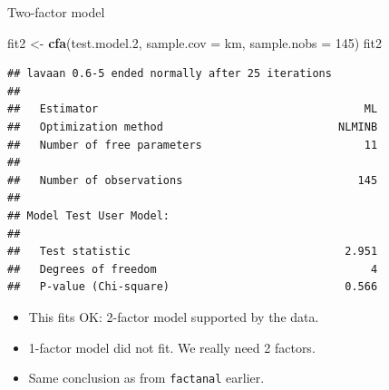 \documentclass[ignorenonframetext,]{beamer}
\newenvironment{Shaded}{\begin{snugshade}}{\end{snugshade}}
\newcommand{\DataTypeTok}[1]{\textcolor[rgb]{0.13,0.29,0.53}{#1}}
\newcommand{\DecValTok}[1]{\textcolor[rgb]{0.00,0.00,0.81}{#1}}
\newcommand{\FloatTok}[1]{\textcolor[rgb]{0.00,0.00,0.81}{#1}}
\newcommand{\KeywordTok}[1]{\textcolor[rgb]{0.13,0.29,0.53}{\textbf{#1}}}
\newcommand{\NormalTok}[1]{#1}
\newcommand{\StringTok}[1]{\textcolor[rgb]{0.31,0.60,0.02}{#1}}
\begin{document}
\begin{frame}[fragile]{Two-factor model}
\protect\hypertarget{two-factor-model}{}

\scriptsize

\begin{Shaded}
\begin{Highlighting}[]
\NormalTok{fit2 <-}\StringTok{ }\KeywordTok{cfa}\NormalTok{(test.model}\FloatTok{.2}\NormalTok{, }\DataTypeTok{sample.cov =}\NormalTok{ km, }\DataTypeTok{sample.nobs =} \DecValTok{145}\NormalTok{)}
\NormalTok{fit2}
\end{Highlighting}
\end{Shaded}

\begin{verbatim}
## lavaan 0.6-5 ended normally after 25 iterations
## 
##   Estimator                                         ML
##   Optimization method                           NLMINB
##   Number of free parameters                         11
##                                                       
##   Number of observations                           145
##                                                       
## Model Test User Model:
##                                                       
##   Test statistic                                 2.951
##   Degrees of freedom                                 4
##   P-value (Chi-square)                           0.566
\end{verbatim}

\normalsize

\begin{itemize}
\item
  This fits OK: 2-factor model supported by the data.
\item
  1-factor model did not fit. We really need 2 factors.
\item
  Same conclusion as from \texttt{factanal} earlier.
\end{itemize}

\end{frame}
\end{document}
